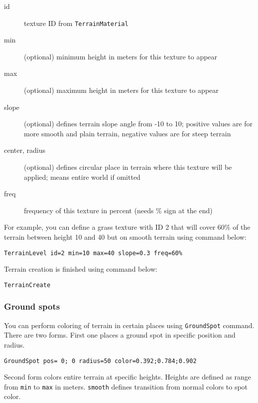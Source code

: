 \begin{description}
    \item[id] texture ID from \texttt{TerrainMaterial}
    \item[min] (optional) minimum height in meters for this texture to appear
    \item[max] (optional) maximum height in meters for this texture to appear
    \item[slope] (optional) defines terrain slope angle from -10 to 10; positive values are for more smooth and plain terrain, negative values are for steep terrain
    \item[center, radius] (optional) defines circular place in terrain where this texture will be applied; means entire world if omitted
    \item[freq] frequency of this texture in percent (needs \% sign at the end)
\end{description}

For example, you can define a grass texture with ID 2 that will cover 60\% of the terrain between height 10 and 40 but on smooth terrain using command below:

\begin{verbatim}
TerrainLevel id=2 min=10 max=40 slope=0.3 freq=60%
\end{verbatim}

Terrain creation is finished using command below:

\begin{verbatim}
TerrainCreate
\end{verbatim}


\subsubsection{Ground spots}

You can perform coloring of terrain in certain places using \texttt{GroundSpot} command. There are two forms. First one places a ground spot in specific position and radius.

\begin{verbatim}
GroundSpot pos= 0; 0 radius=50 color=0.392;0.784;0.902
\end{verbatim}

Second form colors entire terrain at specific heights. Heights are defined as range from \texttt{min} to \texttt{max} in meters. \texttt{smooth} defines transition from normal colors to spot color.

